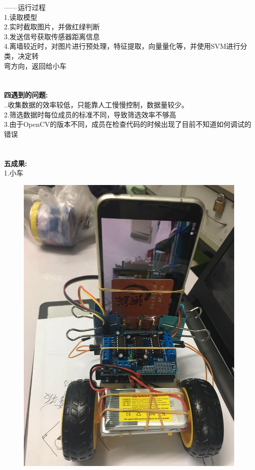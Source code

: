 \documentclass[19pt,a4paper]{article}
\begin{document}
\indent ——运行过程\\
\indent 1.读取模型\\
\indent 2.实时截取图片，并做红绿判断\\
\indent 3.发送信号获取传感器距离信息\\
\indent 4.离墙较近时，对图片进行预处理，特征提取，向量量化等，并使用SVM进行分类，决定转\\
\indent 弯方向，返回给小车\\
\\
\\
\indent\textbf{四\quad 遇到的问题:}\\
..收集数据的效率较低，只能靠人工慢慢控制，数据量较少。\\
\indent 2.筛选数据时每位成员的标准不同，导致筛选效率不够高\\
\indent 3.由于OpenCV的版本不同，成员在检查代码的时候出现了目前不知道如何调试的错误\\
\\
\\
\indent\textbf{五\quad 成果:}\\
\indent 1.小车
\begin{figure}[H]
 \centering
 \includegraphics[scale=0.2]{2.jpeg}
\end{figure}
\end{document}
